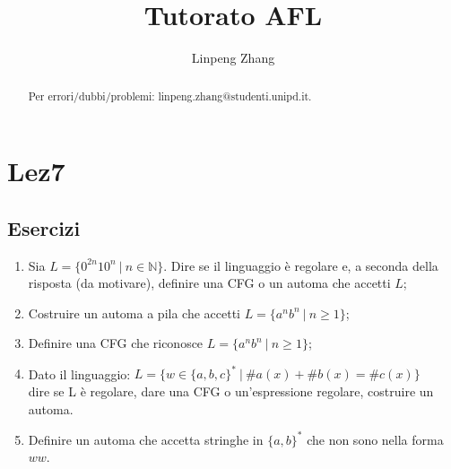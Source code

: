 \documentclass[a4paper,11pt]{article}
\begin{document}
\author{Linpeng Zhang}
\title{Tutorato AFL}
\maketitle
\begin{abstract}
    Per errori/dubbi/problemi: linpeng.zhang@studenti.unipd.it.%
\end{abstract}
\tableofcontents
\section{Lez7}
\subsection{Esercizi}
\begin{enumerate}
    \item Sia $L=\{0^{2n}10^n \ |\  n\in\mathbb{N}\}$. Dire se il linguaggio è regolare e, a seconda della risposta (da motivare), definire una CFG o un automa che accetti $L$;
    \item Costruire un automa a pila che accetti $L=\{a^nb^n \ |\  n\geq 1\}$;
    \item Definire una CFG che riconosce $L=\{a^nb^n \ |\  n\geq 1\}$;
    \item Dato il linguaggio: $L=\{w\in\{a,b,c\}^* \ | \ \#a(x)+\#b(x)=\#c(x)\}$
    \\dire se L è regolare, dare una CFG o un'espressione regolare, costruire un automa.
    \item Definire un automa che accetta stringhe in $\{a, b\}^*$ che non sono nella forma $ww$.
\end{enumerate}
\end{document}
